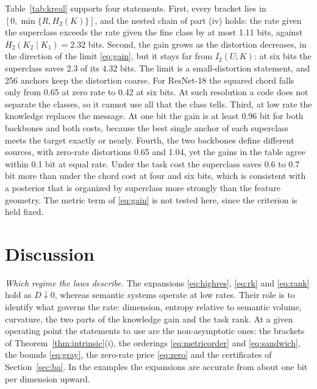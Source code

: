 \documentclass[10pt,journal]{IEEEtran}
\begin{document}
Table~\ref{tab:kreal} supports four statements. First, every bracket lies in $[0,\min\{R,H_2(K)\}]$, and the nested chain of part (iv) holds: the rate given the superclass exceeds the rate given the fine class by at most 1.11 bits, against $H_2(K_2\mid K_1)=2.32$ bits. Second, the gain grows as the distortion decreases, in the direction of the limit \eqref{eq:gain}, but it stays far from $I_2(U;K)$: at six bits the superclass saves 2.3 of its 4.32 bits. The limit is a small-distortion statement, and 256 anchors keep the distortion coarse. For ResNet-18 the squared chord falls only from 0.65 at zero rate to 0.42 at six bits. At such resolution a code does not separate the classes, so it cannot use all that the class tells. Third, at low rate the knowledge replaces the message. At one bit the gain is at least 0.96 bit for both backbones and both costs, because the best single anchor of each superclass meets the target exactly or nearly. Fourth, the two backbones define different sources, with zero-rate distortions 0.65 and 1.04, yet the gains in the table agree within 0.1 bit at equal rate. Under the task cost the superclass saves 0.6 to 0.7 bit more than under the chord cost at four and six bits, which is consistent with a posterior that is organized by superclass more strongly than the feature geometry. The metric term of \eqref{eq:gain} is not tested here, since the criterion is held fixed.

\section{Discussion}
\emph{Which regime the laws describe.} The expansions \eqref{eq:highres}, \eqref{eq:rk} and \eqref{eq:rank} hold as $D\downarrow0$, whereas semantic systems operate at low rates. Their role is to identify what governs the rate: dimension, entropy relative to semantic volume, curvature, the two parts of the knowledge gain and the task rank. At a given operating point the statements to use are the non-asymptotic ones: the brackets of Theorem~\ref{thm:intrinsic}(i), the orderings \eqref{eq:metricorder} and \eqref{eq:sandwich}, the bounds \eqref{eq:gray}, the zero-rate price \eqref{eq:zero} and the certificates of Section~\ref{sec:ba}. In the examples the expansions are accurate from about one bit per dimension upward.
\end{document}
